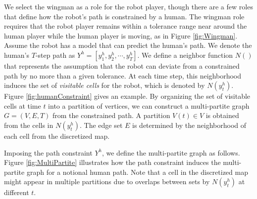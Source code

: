 \documentclass[phd]{byuprop}
\begin{document}
We select the wingman as a role for the robot player, though there are a few roles that define how the robot's path is constrained by a human.
The wingman role requires that the robot player remains within a tolerance range near around the human player while the human player is moving, as in Figure \ref{fig:Wingman}.
Assume the robot has a model that can predict the human's path.
We denote the human's $T$-step path as $ Y^{h} = [y^{h}_{1}, y^{h}_{2} , \cdots , y^{h}_{T}] $.
We define a neighbor function $ N () $ that represents the assumption that the robot can deviate from a constrained path by no more than a given tolerance.  
At each time step, this neighborhood induces the set of {\em visitable cells} for the robot, which is denoted by $ N( y^{h}_{t} ) $.
Figure \ref{fig:humanConstraint} gives an example.
By organizing the set of visitable cells at time $ t $ into a partition of vertices, we can construct a multi-partite graph $ G = (V, E, T) $ from the constrained path.
A partition $ V(t) \in V $ is obtained from the cells in $ N( y^{h}_{t} ) $.
The edge set $ E $ is determined by the neighborhood of each cell from the discretized map.

Imposing the path constraint $ Y^{h} $, we define the multi-partite graph as follows.
Figure \ref{fig:MultiPartite} illustrates how the path constraint induces the multi-partite graph for a notional human path.
Note that a cell in the discretized map might appear in multiple partitions due to overlaps between sets by $ N( y^{h}_{t} ) $ at different $ t $.
\end{document}
